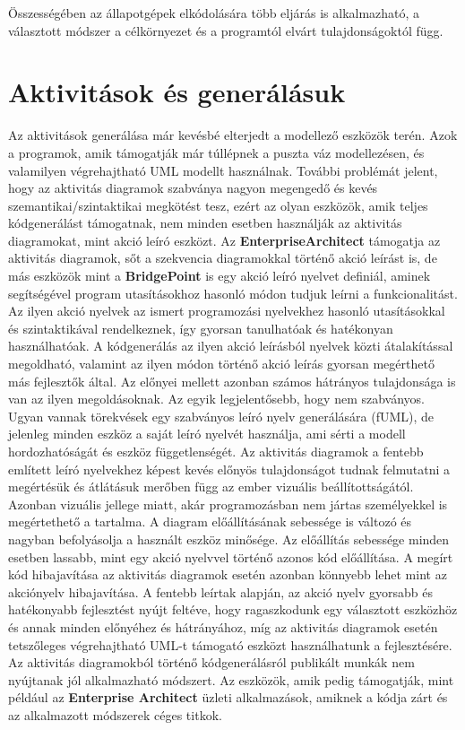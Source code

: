 \documentclass[a4paper,12pt]{report}
\begin{document}
Összességében az állapotgépek elkódolására több eljárás is alkalmazható, a választott módszer a célkörnyezet és a programtól elvárt tulajdonságoktól függ.

\section{Aktivitások és generálásuk}

Az aktivitások generálása már kevésbé elterjedt a modellező eszközök terén. Azok a programok, amik támogatják már túllépnek a puszta váz modellezésen, és valamilyen végrehajtható UML modellt használnak. További problémát jelent, hogy az aktivitás diagramok szabványa nagyon megengedő és kevés szemantikai/szintaktikai megkötést tesz, ezért az olyan eszközök, amik teljes kódgenerálást támogatnak,
nem minden esetben használják az aktivitás diagramokat, mint akció leíró eszközt. Az {\bf EnterpriseArchitect} támogatja az aktivitás diagramok, sőt a szekvencia diagramokkal történő akció leírást is, de más eszközök mint a {\bf BridgePoint}\cite{bp}
is egy akció leíró nyelvet definiál, aminek segítségével program utasításokhoz hasonló módon tudjuk leírni a funkcionalitást. Az ilyen akció nyelvek az ismert programozási nyelvekhez hasonló utasításokkal és szintaktikával rendelkeznek, így
gyorsan tanulhatóak és hatékonyan használhatóak. A kódgenerálás az ilyen akció leírásból nyelvek közti átalakítással megoldható, valamint az ilyen módon történő akció leírás gyorsan megérthető más fejlesztők által. Az előnyei mellett azonban
számos hátrányos tulajdonsága is van az ilyen megoldásoknak. Az egyik legjelentősebb, hogy nem szabványos. Ugyan vannak törekvések egy szabványos leíró nyelv generálására (fUML), de jelenleg minden eszköz a saját leíró nyelvét használja, ami sérti %
a modell hordozhatóságát és eszköz függetlenségét. Az aktivitás diagramok a fentebb említett leíró nyelvekhez képest kevés előnyös tulajdonságot tudnak felmutatni a megértésük és átlátásuk merőben függ az ember vizuális beállítottságától. Azonban vizuális jellege miatt, akár programozásban nem jártas személyekkel is megértethető a tartalma. A diagram előállításának sebessége is változó és nagyban befolyásolja a használt eszköz minősége. Az előállítás sebessége minden esetben lassabb, mint egy akció nyelvvel történő azonos kód előállítása. A megírt kód hibajavítása az aktivitás diagramok esetén azonban könnyebb lehet mint az akciónyelv hibajavítása.
A fentebb leírtak alapján, az akció nyelv gyorsabb és hatékonyabb fejlesztést nyújt feltéve, hogy ragaszkodunk egy választott eszközhöz és annak minden előnyéhez és hátrányához, míg az aktivitás diagramok esetén tetszőleges végrehajtható UML-t támogató eszközt használhatunk a fejlesztésére.
Az aktivitás diagramokból történő kódgenerálásról publikált munkák\cite{bjorklund2004unified,eshuis2001execution}
nem nyújtanak jól alkalmazható módszert. Az eszközök, amik pedig támogatják, mint például az { \bf Enterprise Architect} üzleti alkalmazások, amiknek a kódja zárt és az alkalmazott módszerek céges titkok.
\end{document}
